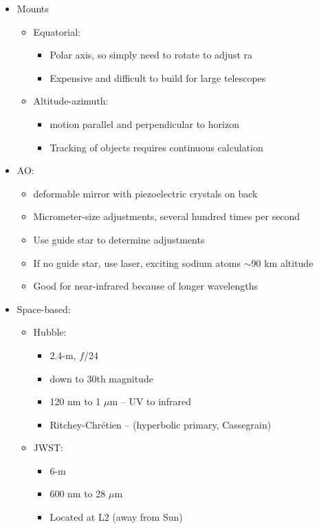 \documentclass[12pt]{article}
\begin{document}
\begin{itemize}
\begin{itemize}
\item Mounts
\begin{itemize}
\item Equatorial: 
\begin{itemize}
\item Polar axis, so simply need to rotate to adjust ra
\item Expensive and difficult to build for large telescopes
\end{itemize}
\item Altitude-azimuth:
\begin{itemize}
\item motion parallel and perpendicular to horizon
\item Tracking of objects requires continuous calculation
\end{itemize}
\end{itemize}
\item AO:
\begin{itemize}
\item deformable mirror with piezoelectric crystals on back
\item Micrometer-size adjustments, several hundred times per second
\item Use guide star to determine adjustments
\item If no guide star, use laser, exciting sodium atoms $\sim90$ km altitude
\item Good for near-infrared because of longer wavelengths
\end{itemize}
\item Space-based:
\begin{itemize}
\item Hubble:
\begin{itemize}
\item 2.4-m, $f$/24
\item down to 30th magnitude
\item 120 nm to 1 $\mu$m -- UV to infrared
\item Ritchey-Chr\'etien -- (hyperbolic primary, Cassegrain)
\end{itemize}
\item JWST:
\begin{itemize}
\item 6-m
\item 600 nm to 28 $\mu$m
\item Located at L2 (away from Sun)
\end{itemize}
\end{itemize}
\end{itemize}

\end{itemize}
\end{document}

